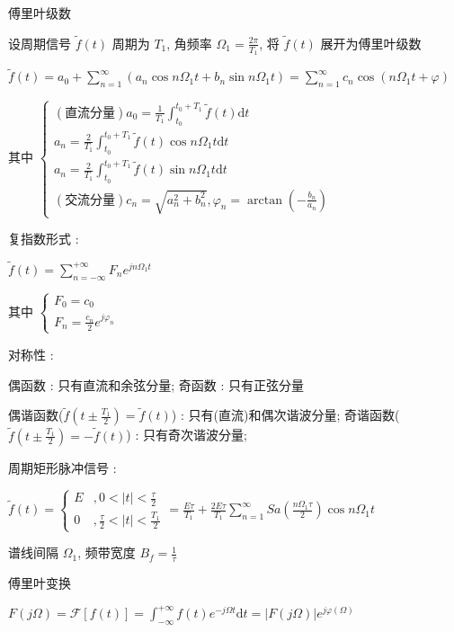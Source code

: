 \documentclass[UTF8, 12pt]{ctexart}
\begin{document}
	\noindent 傅里叶级数

		设周期信号 $ \tilde{f}(t) $ 周期为 $ T_{1} $, 角频率 $ \Omega_{1} = \frac{2\pi}{T_{1}} $, 将 $ \tilde{f}(t) $ 展开为傅里叶级数

		$ \tilde{f}(t) = a_{0} + \sum\limits_{n=1}^{\infty}(a_{n}\cos n\Omega_{1} t + b_{n}\sin n\Omega_{1} t) = \sum\limits_{n=1}^{\infty}c_{n}\cos(n\Omega_{1}t + \varphi) $

		其中 $ \begin{cases}
			(\text{直流分量})a_{0} = \frac{1}{T_{1}}\int_{t_{0}}^{t_{0}+T_{1}}\tilde{f}(t)\mathrm{d}t \\
			a_{n} = \frac{2}{T_{1}}\int_{t_{0}}^{t_{0}+T_{1}}\tilde{f}(t)\cos n\Omega_{1}t\mathrm{d}t \\
			a_{n} = \frac{2}{T_{1}}\int_{t_{0}}^{t_{0}+T_{1}}\tilde{f}(t)\sin n\Omega_{1}t\mathrm{d}t \\
			(\text{交流分量})c_{n} = \sqrt{a_{n}^{2}+b_{n}^{2}}, \varphi_{n} = \arctan(-\frac{b_{n}}{a_{n}})
			\end{cases} $
		
		复指数形式 :
				
			$ \tilde{f}(t) = \sum\limits_{n=-\infty}^{+\infty}F_{n}e^{jn\Omega_{1}t} $

			其中 $ \begin{cases}
				F_{0} = c_{0} \\
				F_{n} = \frac{c_{n}}{2}e^{j\varphi_{n}}
			\end{cases} $

		对称性 : 
			
			偶函数 : 只有直流和余弦分量; 奇函数 : 只有正弦分量

			偶谐函数($ \tilde{f}(t \pm \frac{T_{1}}{2}) = \tilde{f}(t) $) : 只有(直流)和偶次谐波分量; 奇谐函数($ \tilde{f}(t \pm \frac{T_{1}}{2}) = -\tilde{f}(t) $) : 只有奇次谐波分量; 

		周期矩形脉冲信号 :

			$ \tilde{f}(t) = \begin{cases} E&, 0 < |t| < \frac{\tau}{2} \\ 0&, \frac{\tau}{2} < |t| < \frac{T_{1}}{2} \end{cases}  
			= \frac{E\tau}{T_{1}} + \frac{2E\tau}{T_{1}}\sum\limits_{n=1}^{\infty}Sa(\frac{n\Omega_{1}\tau}{2})\cos n\Omega_{1}t $

			谱线间隔 $ \Omega_{1} $, 频带宽度 $ B_{f} = \frac{1}{\tau} $
	
	\noindent 傅里叶变换
		
		$ F(j\Omega) = \mathscr{F}[f(t)] = \int_{-\infty}^{+\infty}f(t)e^{-j\Omega t}\mathrm{d}t = |F(j\Omega)|e^{j\varphi(\Omega)} $
\end{document}
